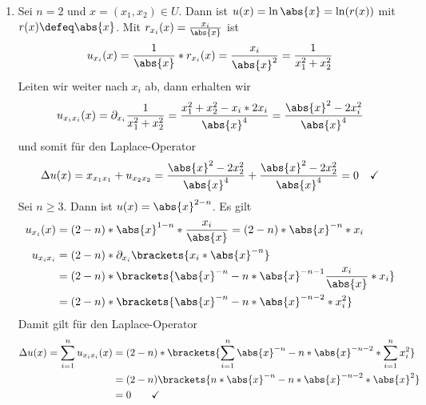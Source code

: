 \begin{exercisePage}
	\begin{enumerate}[label=(zu \alph*), leftmargin=*]
		\item Sei $n = 2$ und $x = (x_1, x_2) \in U$. Dann ist $u(x) = \ln \abs{x} = \ln(r(x))$ mit $r(x) \defeq \abs{x}$. Mit $r_{x_i}(x) = \frac{x_i}{\abs{x}}$ ist
		\begin{equation*}
			u_{x_i}(x) = \frac{1}{\abs{x}} * r_{x_i}(x) = \frac{x_i}{\abs{x}^2} = \frac{1}{x_1^2 + x_2^2}
		\end{equation*}
		Leiten wir weiter nach $x_i$ ab, dann erhalten wir
		\begin{equation*}
			u_{x_i x_i}(x) = \partial_{x_i} \frac{1}{x_1^2 + x_2^2} = \frac{x_1^2 + x_2^2 - x_i * 2x_i}{\abs{x}^4} = \frac{\abs{x}^2 - 2x_i^2}{\abs{x}^4}
		\end{equation*}
		und somit für den Laplace-Operator
		\begin{equation*}
			\Delta u(x) = x_{x_1 x_1} + u_{x_2 x_2} = \frac{\abs{x}^2 - 2x_2^2}{\abs{x}^4} + \frac{\abs{x}^2 - 2x_2^2}{\abs{x}^4}= 0 \quad \checkmark
		\end{equation*}
		Sei $n \ge 3$. Dann ist $u(x) = \abs{x}^{2-n}$. Es gilt
		\begin{equation*}
			\begin{aligned}
				u_{x_i}(x) &= (2-n) * \abs{x}^{1-n} * \frac{x_i}{\abs{x}} = (2-n) * \abs{x}^{-n} * x_i \\
				u_{x_i x_i} &= (2-n) * \partial_{x_i} \brackets{x_i * \abs{x}^{-n}} \\
				&= (2-n) * \brackets{\abs{x}^{-n} - n * \abs{x}^{-n-1} \frac{x_i}{\abs{x}} * x_i} \\
				&= (2-n) * \brackets{\abs{x}^{-n} - n * \abs{x}^{-n-2} * x_i^2} 
			\end{aligned}
		\end{equation*}
		Damit gilt für den Laplace-Operator
		\begin{equation*}
			\begin{aligned}
				\Delta u(x) = \sum_{i=1}^n u_{x_i x_i}(x) 
				&= (2-n) * \brackets{\sum_{i=1}^n \abs{x}^{-n} - n * \abs{x}^{-n-2} * \sum_{i=1}^n x_i^2} \\
				&= (2-n) \brackets{n * \abs{x}^{-n} - n* \abs{x}^{-n-2} * \abs{x}^2} \\
				&= 0 \qquad \checkmark
			\end{aligned}
		\end{equation*}
		

\end{enumerate}
\end{exercisePage}
